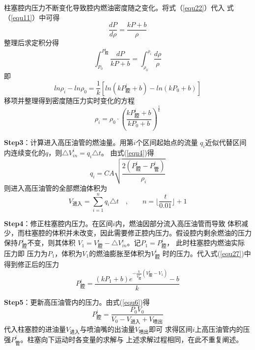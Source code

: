 \documentclass[withoutpreface,bwprint]{cumcmthesis} %
\begin{document}
    柱塞腔内压力不断变化导致腔内燃油密度随之变化。将式（\ref{equ22}）代入
    式（\ref{equ11}）中可得
    \begin{equation}
        \frac{dP}{d\rho}=\frac{kP+b}{\rho}
    \label{equ31}
    \end{equation}
    整理后求定积分得
    \begin{equation}
        \int_{P_0}^{P_{\text{腔}}^i}\frac{dP}{kP+b}=\int_{\rho_0}^{\rho_i}\frac{d\rho}{\rho}
    \label{equ32}
    \end{equation}
    即
    \begin{equation}
        ln\rho_i-ln\rho_0=\frac{1}{k}[ln(kP_{\text{腔}}^i+b)-ln(kP_0+b)]
    \label{equ33}
    \end{equation} 
    移项并整理得到密度随压力实时变化的方程
    \begin{equation}
        \rho_i=\rho_0\cdot(\frac{kP_{\text{腔}}^i+b}{kP_0+b})^{\frac{1}{k}}
    \label{rho}
    \end{equation} 
   

    \textbf{Step3}：计算进入高压油管的燃油量。用第$i$个区间起始点的流量
    $q_i$近似代替区间内连续变化的$q$，则$\triangle V_{in}^i=q_i\triangle t$。
    由式(\ref{equ4})得
    \begin{equation}
        q_i=CA\sqrt{\frac{2(P_{\text{腔}}^i-P_{\text{管}}^i)}{\rho_i}}
    \label{equ35}
    \end{equation} 
    则进入高压油管的全部燃油体积为
    \begin{equation}
        V_{\text{进入}}= \sum\limits_{i=1}^n q_i\triangle t
        \quad , \quad \quad n={\lfloor{\frac{t}{0.01}}\rfloor+1}
    \label{equ36}
    \end{equation} 

    
    \textbf{Step4}：修正柱塞腔内压力。在区间$i$内，燃油因部分流入高压油管而导致
    体积减少，而柱塞腔的体积并未改变，因此需要修正腔内压力。假设腔内剩余燃油的压力
    保持$P_{\text{腔}}^i$不变，则其体积
    $V_1=V_{\text{腔}}^i-\triangle V_{in}^i$。记$P_1=P_{\text{腔}}^i$，
    此时柱塞腔内燃油实际压力即
    压力为$P_1$，体积为$V_1$的燃油膨胀至体积为$V_{\text{腔}}^i$
    时的压力。代入式(\ref{equ27})中得到修正后的压力
    \begin{equation}
        P_{\text{腔}}^i=\frac{(kP_1+b)e^{-\frac{k}{V_{\text{腔}}^i}(V_{\text{腔}}^i-V_1)}-b}{k}
    \label{equ37}
    \end{equation}

    \textbf{Step5}：更新高压油管内的压力。由式(\ref{equ6})得
    \begin{equation}
        P_{\text{腔}}^i=\frac{P_0V_0}{V_0-V_{\text{进入}}+V_{\text{喷出}}}
    \label{equ38}
    \end{equation}
    代入柱塞腔的进油量$V_{\text{进入}}$与喷油嘴的出油量$V_{\text{喷出}}$即可
    求得区间$i$上高压油管内的压强$P_{\text{管}}^i$。柱塞向下运动时各变量的求解与
    上述求解过程相同，在此不重复阐述。
\end{document}
